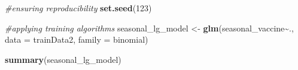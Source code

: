 \documentclass[
]{article}
\newenvironment{Shaded}{\begin{snugshade}}{\end{snugshade}}
\newcommand{\AttributeTok}[1]{\textcolor[rgb]{0.13,0.29,0.53}{#1}}
\newcommand{\CommentTok}[1]{\textcolor[rgb]{0.56,0.35,0.01}{\textit{#1}}}
\newcommand{\DecValTok}[1]{\textcolor[rgb]{0.00,0.00,0.81}{#1}}
\newcommand{\FunctionTok}[1]{\textcolor[rgb]{0.13,0.29,0.53}{\textbf{#1}}}
\newcommand{\NormalTok}[1]{#1}
\newcommand{\OtherTok}[1]{\textcolor[rgb]{0.56,0.35,0.01}{#1}}
\newcommand{\SpecialCharTok}[1]{\textcolor[rgb]{0.81,0.36,0.00}{\textbf{#1}}}
\begin{document}
\begin{Shaded}
\begin{Highlighting}[]
\CommentTok{\#ensuring reproducibility }
\FunctionTok{set.seed}\NormalTok{(}\DecValTok{123}\NormalTok{)}

\CommentTok{\#applying training algorithms}
\NormalTok{seasonal\_lg\_model }\OtherTok{\textless{}{-}} \FunctionTok{glm}\NormalTok{(seasonal\_vaccine}\SpecialCharTok{\textasciitilde{}}\NormalTok{., }\AttributeTok{data =}\NormalTok{ trainData2, }\AttributeTok{family =}\NormalTok{ binomial)}
\end{Highlighting}
\end{Shaded}

\begin{Shaded}
\begin{Highlighting}[]
\FunctionTok{summary}\NormalTok{(seasonal\_lg\_model)}
\end{Highlighting}
\end{Shaded}
\end{document}
